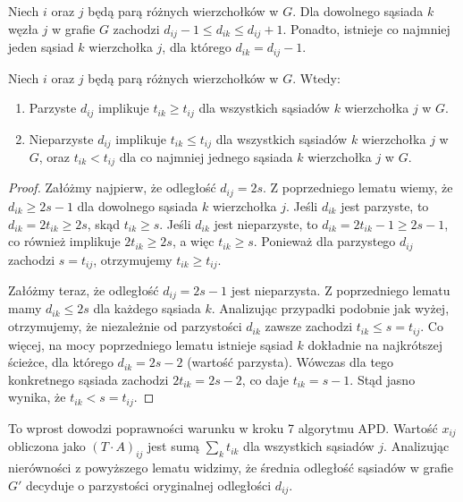 \begin{lemat}
Niech $i$ oraz $j$ będą parą różnych wierzchołków w $G$. Dla dowolnego sąsiada $k$ węzła $j$ w grafie $G$ zachodzi $d_{ij} - 1 \leq d_{ik} \leq d_{ij} + 1$. Ponadto, istnieje co najmniej jeden sąsiad $k$ wierzchołka $j$, dla którego $d_{ik} = d_{ij} - 1$.
\end{lemat}

\begin{lemat}
Niech $i$ oraz $j$ będą parą różnych wierzchołków w $G$. Wtedy:
\begin{enumerate}
  \item Parzyste $d_{ij}$ implikuje $t_{ik} \geq t_{ij}$ dla wszystkich sąsiadów $k$ wierzchołka $j$ w $G$.
  \item Nieparzyste $d_{ij}$ implikuje $t_{ik} \leq t_{ij}$ dla wszystkich sąsiadów $k$ wierzchołka $j$ w $G$, oraz $t_{ik} < t_{ij}$ dla co najmniej jednego sąsiada $k$ wierzchołka $j$ w $G$.
\end{enumerate}
\end{lemat}

\begin{proof}
Załóżmy najpierw, że odległość $d_{ij} = 2s$. Z poprzedniego lematu wiemy, że $d_{ik} \geq 2s - 1$ dla dowolnego sąsiada $k$ wierzchołka $j$. Jeśli $d_{ik}$ jest parzyste, to $d_{ik} = 2t_{ik} \geq 2s$, skąd $t_{ik} \geq s$. Jeśli $d_{ik}$ jest nieparzyste, to $d_{ik} = 2t_{ik} - 1 \geq 2s - 1$, co również implikuje $2t_{ik} \geq 2s$, a więc $t_{ik} \geq s$. Ponieważ dla parzystego $d_{ij}$ zachodzi $s = t_{ij}$, otrzymujemy $t_{ik} \geq t_{ij}$.

Załóżmy teraz, że odległość $d_{ij} = 2s - 1$ jest nieparzysta. Z poprzedniego lematu mamy $d_{ik} \leq 2s$ dla każdego sąsiada $k$. Analizując przypadki podobnie jak wyżej, otrzymujemy, że niezależnie od parzystości $d_{ik}$ zawsze zachodzi $t_{ik} \leq s = t_{ij}$. Co więcej, na mocy poprzedniego lematu istnieje sąsiad $k$ dokładnie na najkrótszej ścieżce, dla którego $d_{ik} = 2s - 2$ (wartość parzysta). Wówczas dla tego konkretnego sąsiada zachodzi $2t_{ik} = 2s - 2$, co daje $t_{ik} = s - 1$. Stąd jasno wynika, że $t_{ik} < s = t_{ij}$.
\end{proof}

To wprost dowodzi poprawności warunku w kroku 7 algorytmu APD. Wartość $x_{ij}$ obliczona jako $(T \cdot A)_{ij}$ jest sumą $\sum_k t_{ik}$ dla wszystkich sąsiadów $j$. Analizując nierówności z powyższego lematu widzimy, że średnia odległość sąsiadów w grafie $G'$ decyduje o parzystości oryginalnej odległości $d_{ij}$.

